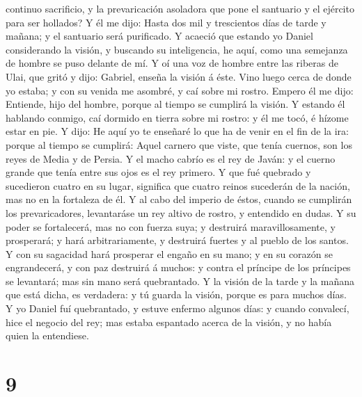 continuo sacrificio, y la prevaricación asoladora que pone el santuario
y el ejército para ser hollados?  Y él me dijo: Hasta dos
mil y trescientos días de tarde y mañana; y el santuario será
purificado.  Y acaeció que estando yo Daniel considerando
la visión, y buscando su inteligencia, he aquí, como una semejanza de
hombre se puso delante de mí.  Y oí una voz de hombre
entre las riberas de Ulai, que gritó y dijo: Gabriel, enseña la visión á
éste.  Vino luego cerca de donde yo estaba; y con su
venida me asombré, y caí sobre mi rostro. Empero él me dijo: Entiende,
hijo del hombre, porque al tiempo se cumplirá la visión. 
Y estando él hablando conmigo, caí dormido en tierra sobre mi rostro: y
él me tocó, é hízome estar en pie.  Y dijo: He aquí yo te
enseñaré lo que ha de venir en el fin de la ira: porque al tiempo se
cumplirá:  Aquel carnero que viste, que tenía cuernos,
son los reyes de Media y de Persia.  Y el macho cabrío es
el rey de Javán: y el cuerno grande que tenía entre sus ojos es el rey
primero.  Y que fué quebrado y sucedieron cuatro en su
lugar, significa que cuatro reinos sucederán de la nación, mas no en la
fortaleza de él.  Y al cabo del imperio de éstos, cuando
se cumplirán los prevaricadores, levantaráse un rey altivo de rostro, y
entendido en dudas.  Y su poder se fortalecerá, mas no
con fuerza suya; y destruirá maravillosamente, y prosperará; y hará
arbitrariamente, y destruirá fuertes y al pueblo de los santos.
 Y con su sagacidad hará prosperar el engaño en su mano;
y en su corazón se engrandecerá, y con paz destruirá á muchos: y contra
el príncipe de los príncipes se levantará; mas sin mano será
quebrantado.  Y la visión de la tarde y la mañana que
está dicha, es verdadera: y tú guarda la visión, porque es para muchos
días.  Y yo Daniel fuí quebrantado, y estuve enfermo
algunos días: y cuando convalecí, hice el negocio del rey; mas estaba
espantado acerca de la visión, y no había quien la entendiese.

\hypertarget{section-8}{%
\section{9}\label{section-8}}

